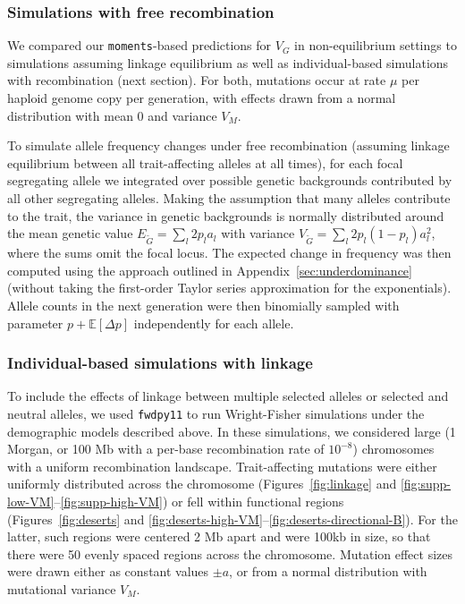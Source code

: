 \documentclass{article}
\newcommand{\E}{\mathbb{E}}
\newcommand{\moments}{\texttt{moments}\xspace}
\newcommand{\fwdpy}{\texttt{fwdpy11}\xspace}
\begin{document}
\subsubsection*{Simulations with free recombination}

We compared our \moments-based predictions for $V_G$ in non-equilibrium
settings to simulations assuming linkage equilibrium as well as
individual-based simulations with recombination (next section). For both,
mutations occur at rate $\mu$ per haploid genome copy per generation, with
effects drawn from a normal distribution with mean 0 and variance $V_M$.

To simulate allele frequency changes under free recombination (assuming linkage
equilibrium between all trait-affecting alleles at all times), for each focal
segregating allele we integrated over possible genetic backgrounds contributed
by all other segregating alleles. Making the assumption that many alleles
contribute to the trait, the variance in genetic backgrounds is normally
distributed around the mean genetic value $E_{\tilde{G}}=\sum_l 2p_l a_l$ with
variance $V_{\tilde{G}}=\sum_l 2p_l(1-p_l)a_l^2$, where the sums omit the focal
locus. The expected change in frequency was then computed using the approach
outlined in Appendix~\ref{sec:underdominance} (without taking the first-order
Taylor series approximation for the exponentials). Allele counts in the next
generation were then binomially sampled with parameter $p+\E[\Delta p]$
independently for each allele.

\subsubsection*{Individual-based simulations with linkage}

To include the effects of linkage between multiple selected alleles or selected
and neutral alleles, we used \fwdpy \citep{thornton2019polygenic} to run
Wright-Fisher simulations under the demographic models described above. In
these simulations, we considered large (1 Morgan, or 100 Mb with a per-base
recombination rate of $10^{-8}$) chromosomes with a uniform recombination
landscape. Trait-affecting mutations were either uniformly distributed across
the chromosome (Figures~\ref{fig:linkage} and
\ref{fig:supp-low-VM}--\ref{fig:supp-high-VM}) or fell within functional
regions (Figures~\ref{fig:deserts} and
\ref{fig:deserts-high-VM}--\ref{fig:deserts-directional-B}). For the latter,
such regions were centered 2 Mb apart and were 100kb in size, so that there
were 50 evenly spaced regions across the chromosome. Mutation effect sizes were
drawn either as constant values $\pm a$, or from a normal distribution with
mutational variance $V_M$.
\end{document}
